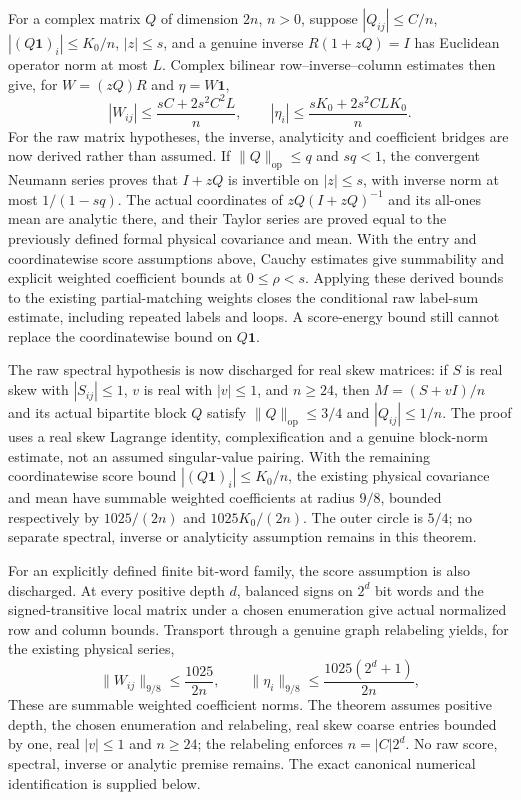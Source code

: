 \documentclass[11pt]{article}
\begin{document}
For a complex matrix $Q$ of dimension $2n$, $n>0$, suppose $|Q_{ij}|\le C/n$, $|(Q\mathbf1)_i|\le K_0/n$, $|z|\le s$, and a genuine inverse $R(1+zQ)=I$ has Euclidean operator norm at most $L$. Complex bilinear row--inverse--column estimates then give, for $W=(zQ)R$ and $\eta=W\mathbf1$,
\[
 |W_{ij}|\le\frac{sC+2s^2C^2L}{n},\qquad
 |\eta_i|\le\frac{sK_0+2s^2CLK_0}{n}.
\]
For the raw matrix hypotheses, the inverse, analyticity and coefficient bridges are now derived rather than assumed. If $\|Q\|_{\mathrm{op}}\le q$ and $sq<1$, the convergent Neumann series proves that $I+zQ$ is invertible on $|z|\le s$, with inverse norm at most $1/(1-sq)$. The actual coordinates of $zQ(I+zQ)^{-1}$ and its all-ones mean are analytic there, and their Taylor series are proved equal to the previously defined formal physical covariance and mean. With the entry and coordinatewise score assumptions above, Cauchy estimates give summability and explicit weighted coefficient bounds at $0\le\rho<s$. Applying these derived bounds to the existing partial-matching weights closes the conditional raw label-sum estimate, including repeated labels and loops. A score-energy bound still cannot replace the coordinatewise bound on $Q\mathbf1$.

The raw spectral hypothesis is now discharged for real skew matrices: if $S$ is real skew with $|S_{ij}|\le1$, $v$ is real with $|v|\le1$, and $n\ge24$, then $M=(S+vI)/n$ and its actual bipartite block $Q$ satisfy $\|Q\|_{\mathrm{op}}\le3/4$ and $|Q_{ij}|\le1/n$. The proof uses a real skew Lagrange identity, complexification and a genuine block-norm estimate, not an assumed singular-value pairing. With the remaining coordinatewise score bound $|(Q\mathbf1)_i|\le K_0/n$, the existing physical covariance and mean have summable weighted coefficients at radius $9/8$, bounded respectively by $1025/(2n)$ and $1025K_0/(2n)$. The outer circle is $5/4$; no separate spectral, inverse or analyticity assumption remains in this theorem.

For an explicitly defined finite bit-word family, the score assumption is also discharged. At every positive depth $d$, balanced signs on $2^d$ bit words and the signed-transitive local matrix under a chosen enumeration give actual normalized row and column bounds. Transport through a genuine graph relabeling yields, for the existing physical series,
\[
 \|W_{ij}\|_{9/8}\le\frac{1025}{2n},\qquad
 \|\eta_i\|_{9/8}\le\frac{1025(2^d+1)}{2n},
\]
These are summable weighted coefficient norms. The theorem assumes positive depth, the chosen enumeration and relabeling, real skew coarse entries bounded by one, real $|v|\le1$ and $n\ge24$; the relabeling enforces $n=|C|2^d$. No raw score, spectral, inverse or analytic premise remains. The exact canonical numerical identification is supplied below.
\end{document}
